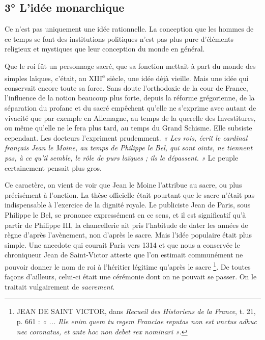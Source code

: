 \documentclass[french,twoside]{book} %
\begin{document}
\subsection[3° L’idée monarchique]{3° L’idée monarchique}
\label{c03b3}
\noindent Ce n’est pas uniquement une idée rationnelle. La conception que les hommes de ce temps se font des institutions politiques n’est pas plus pure d’éléments religieux et mystiques que leur conception du monde en général.\par
Que le roi fût un personnage sacré, que sa fonction mettait à part du monde des simples laïques, c’était, au XIII\textsuperscript{e} siècle, une idée déjà vieille. Mais une idée qui conservait encore toute sa force. Sans doute l’orthodoxie de la cour de France, l’influence de la notion beaucoup plus forte, depuis la réforme grégorienne, de la séparation  
\label{p17} du profane et du sacré empêchent qu’elle ne s’exprime avec autant de vivacité que par exemple en Allemagne, au temps de la querelle des Investitures, ou même qu’elle ne le fera plus tard, au temps du Grand Schisme. Elle subsiste cependant. Les docteurs l’expriment prudemment. \emph{« Les rois, écrit le cardinal français Jean le Moine, au temps de Philippe le Bel, qui sont oints, ne tiennent pas, à ce qu’il semble, le rôle de purs laïques ; ils le dépassent. »} Le peuple certainement pensait plus gros.\par
Ce caractère, on vient de voir que Jean le Moine l’attribue au sacre, ou plus précisément à l’onction. La thèse officielle était pourtant que le sacre n’était pas indispensable à l’exercice de la dignité royale. Le publiciste Jean de Paris, sous Philippe le Bel, se prononce expressément en ce sens, et il est significatif qu’à partir de Philippe III, la chancellerie ait pris l’habitude de dater les années de règne d’après l’avènement, non d’après le sacre. Mais l’idée populaire était plus simple. Une anecdote qui courait Paris vers 1314 et que nous a conservée le chroniqueur Jean de Saint-Victor atteste que l’on estimait communément ne pouvoir donner le nom de roi à l’héritier légitime qu’après le sacre \footnote{ JEAN DE SAINT VICTOR, dans {\itshape Recueil des Historiens de la France}, t. 21, p. 661 : \emph{« ... Ille enim quem tu regem Franciae reputas non est unctus adhuc nec coronatus, et ante hoc non debet rex nominari »}.}. De toutes façons d’ailleurs, celui-ci était une cérémonie dont on ne pouvait se passer. On le traitait vulgairement de \emph{sacrement}.\par
\end{document}
